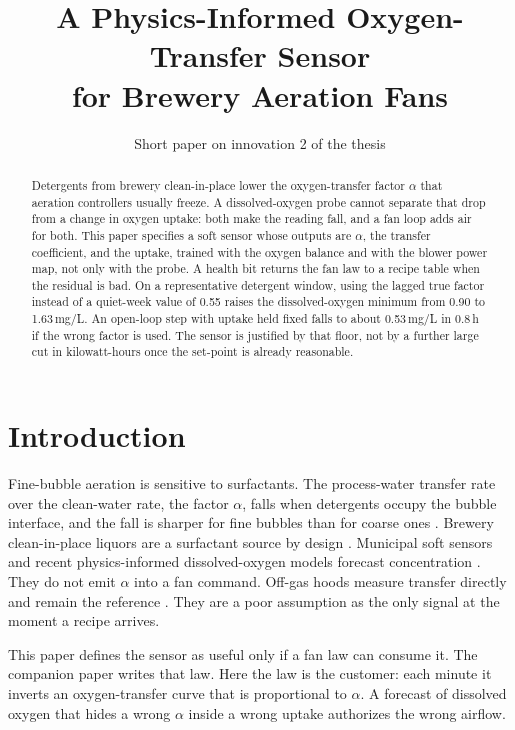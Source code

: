 \documentclass[11pt,a4paper]{article}
\title{A Physics-Informed Oxygen-Transfer Sensor\\for Brewery Aeration Fans}
\author{Short paper on innovation 2 of the thesis}
\date{}
\begin{document}
\maketitle
\thispagestyle{empty}

\begin{abstract}
\noindent
Detergents from brewery clean-in-place lower the oxygen-transfer factor \(\alpha\) that aeration controllers usually freeze. A dissolved-oxygen probe cannot separate that drop from a change in oxygen uptake: both make the reading fall, and a fan loop adds air for both. This paper specifies a soft sensor whose outputs are \(\alpha\), the transfer coefficient, and the uptake, trained with the oxygen balance and with the blower power map, not only with the probe. A health bit returns the fan law to a recipe table when the residual is bad. On a representative detergent window, using the lagged true factor instead of a quiet-week value of 0.55 raises the dissolved-oxygen minimum from 0.90 to 1.63\,mg/L. An open-loop step with uptake held fixed falls to about 0.53\,mg/L in 0.8\,h if the wrong factor is used. The sensor is justified by that floor, not by a further large cut in kilowatt-hours once the set-point is already reasonable.
\end{abstract}

\section{Introduction}

Fine-bubble aeration is sensitive to surfactants. The process-water transfer rate over the clean-water rate, the factor \(\alpha\), falls when detergents occupy the bubble interface, and the fall is sharper for fine bubbles than for coarse ones \cite{rosso2006,mueller2002}. Brewery clean-in-place liquors are a surfactant source by design \cite{simate2011,goode2013,fillaudeau2006}. Municipal soft sensors and recent physics-informed dissolved-oxygen models forecast concentration \cite{haimi2013,koksal2024,raissi2019}. They do not emit \(\alpha\) into a fan command. Off-gas hoods measure transfer directly and remain the reference \cite{redmon1983,leu2009}. They are a poor assumption as the only signal at the moment a recipe arrives.

This paper defines the sensor as useful only if a fan law can consume it. The companion paper writes that law. Here the law is the customer: each minute it inverts an oxygen-transfer curve that is proportional to \(\alpha\). A forecast of dissolved oxygen that hides a wrong \(\alpha\) inside a wrong uptake authorizes the wrong airflow.
\end{document}

